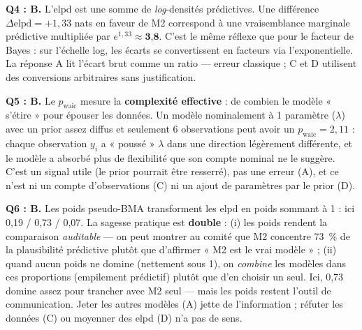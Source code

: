 \documentclass[11pt,a4paper]{article}
\begin{document}
\begin{corrigebox}
\textbf{Q4 : B.} L'elpd est une somme de \emph{log}-densités prédictives.
Une différence $\Delta\text{elpd} = +1{,}33$ nats en faveur de M2 correspond
à une vraisemblance marginale prédictive multipliée par $e^{1{,}33} \approx
\textbf{3{,}8}$. C'est le même réflexe que pour le facteur de Bayes : sur
l'échelle log, les écarts se convertissent en facteurs via l'exponentielle.
La réponse A lit l'écart brut comme un ratio --- erreur classique ;
C et D utilisent des conversions arbitraires sans justification.

\textbf{Q5 : B.} Le $p_{\text{waic}}$ mesure la \textbf{complexité effective}
: de combien le modèle « s'étire » pour épouser les données. Un modèle
nominalement à 1 paramètre ($\lambda$) avec un prior assez diffus et
seulement 6 observations peut avoir un $p_{\text{waic}} = 2{,}11$ : chaque
observation $y_i$ a « poussé » $\lambda$ dans une direction légèrement
différente, et le modèle a absorbé plus de flexibilité que son compte
nominal ne le suggère. C'est un signal utile (le prior pourrait être
resserré), pas une erreur (A), et ce n'est ni un compte d'observations (C)
ni un ajout de paramètres par le prior (D).

\textbf{Q6 : B.} Les poids pseudo-BMA transforment les elpd en poids sommant
à 1 : ici 0,19 / 0,73 / 0,07. La sagesse pratique est \textbf{double} :
(i) les poids rendent la comparaison \emph{auditable} --- on peut montrer au
comité que M2 concentre 73~\% de la plausibilité prédictive plutôt que
d'affirmer « M2 est le vrai modèle » ; (ii) quand aucun poids ne domine
(nettement sous 1), on \emph{combine} les modèles dans ces proportions
(empilement prédictif) plutôt que d'en choisir un seul. Ici, 0,73 domine
assez pour trancher avec M2 seul --- mais les poids restent l'outil de
communication. Jeter les autres modèles (A) jette de l'information ;
réfuter les données (C) ou moyenner des elpd (D) n'a pas de sens.
\end{corrigebox}
\end{document}
